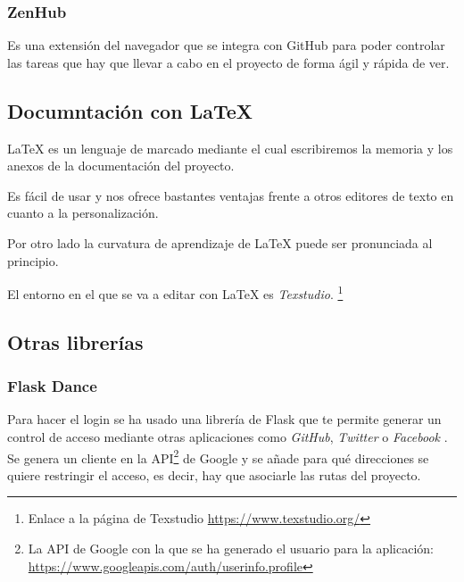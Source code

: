 \subsubsection{ZenHub}
Es una extensión del navegador que se integra con GitHub para poder controlar las tareas que hay que llevar a cabo en el proyecto de forma ágil y rápida de ver.

\subsection{Documntación con \LaTeX{}}
\LaTeX{}\cite{tex} es un lenguaje de marcado mediante el cual escribiremos la memoria y los anexos de la documentación del proyecto.

Es fácil de usar y nos ofrece bastantes ventajas frente a otros editores de texto en cuanto a la personalización. 

Por otro lado la curvatura de aprendizaje de \LaTeX{} puede ser pronunciada al principio.

El entorno en el que se va a editar con \LaTeX{} es \textit{Texstudio}. \footnote{Enlace a la página de Texstudio \url{https://www.texstudio.org/}}

\subsection{Otras librerías}

\subsubsection{Flask Dance}
Para hacer el login se ha usado una librería de Flask que te permite generar un control de acceso mediante otras aplicaciones como \textit{GitHub}, \textit{Twitter} o \textit{Facebook} \cite{dance}.
Se genera un cliente en la API\footnote{La API de Google con la que se ha generado el usuario para la aplicación: \url{https://www.googleapis.com/auth/userinfo.profile}} de Google y se añade para qué direcciones se quiere restringir el acceso, es decir, hay que asociarle las rutas del proyecto.




